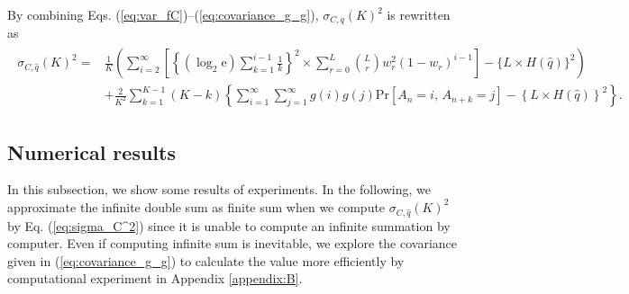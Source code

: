 \documentclass[dvipdfmx,english]{ampmt} %
\begin{document}
\par
By combining Eqs. (\ref{eq:var_fC})--(\ref{eq:covariance_g_g}), $\sigma_{C,q}(K)^2$ is rewritten as
\begin{align}\begin{split}\label{eq:sigma_C^2}
  \sigma_{C,\hat{q}}(K)^2  
  =& \frac{1}{K} \left( \sum_{i=2}^{\infty} \left[\left\{ (\log_2 \mathrm{e}) \sum_{k=1}^{i-1} \frac{1}{k} \right\}^2 \times \sum_{r=0}^{L} \binom{L}{r} w_r^2 (1-w_r)^{i-1}\right] - \{L \times H(\hat{q})\}^2 \right)\\
  &+ \frac{2}{K^2}\sum_{k=1}^{K-1}(K-k) \left\{\sum_{i=1}^{\infty}\sum_{j=1}^{\infty}g(i)g(j)\mathrm{Pr}[A_n=i, \, A_{n+k}=j] - \left\{L \times H(\hat{q})\right\}^2\right\}.
\end{split}\end{align}
\clearpage
\subsection{Numerical results}\label{subsec:numerical_exp_L4}
In this subsection, we show some results of experiments. 
In the following, we approximate the infinite double sum as finite sum when we compute $\sigma_{C,\hat{q}} (K)^2$ by Eq. (\ref{eq:sigma_C^2}) since it is unable to compute an infinite summation by computer. Even if computing infinite sum is inevitable, we explore the covariance given in (\ref{eq:covariance_g_g}) to calculate the value more efficiently by computational experiment in Appendix \ref{appendix:B}.
%
\end{document}
